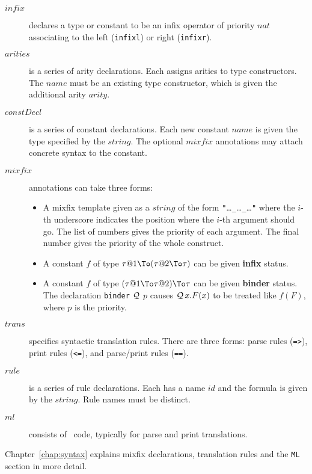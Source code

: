 \begin{description}
\item[$infix$] 
  declares a type or constant to be an infix operator of priority $nat$
  associating to the left ({\tt infixl}) or right ({\tt infixr}).

\item[$arities$] 
  is a series of arity declarations.  Each assigns arities to type
  constructors.  The $name$ must be an existing type constructor, which is
  given the additional arity $arity$.

\item[$constDecl$] 
  is a series of constant declarations.  Each new constant $name$ is given
  the type specified by the $string$.  The optional $mixfix$ annotations
  may attach concrete syntax to the constant.

\item[$mixfix$] 
  annotations can take three forms:
  \begin{itemize}
  \item A mixfix template given as a $string$ of the form
    {\tt"}\dots{\tt\_}\dots{\tt\_}\dots{\tt"} where the $i$-th underscore
    indicates the position where the $i$-th argument should go.  The list
    of numbers gives the priority of each argument.  The final number gives
    the priority of the whole construct.

  \item A constant $f$ of type $\tau@1\To(\tau@2\To\tau)$ can be given {\bf
    infix} status.

  \item A constant $f$ of type $(\tau@1\To\tau@2)\To\tau$ can be given {\bf
    binder} status.  The declaration {\tt binder} $\cal Q$ $p$ causes
  ${\cal Q}\,x.F(x)$ to be treated
  like $f(F)$, where $p$ is the priority.
  \end{itemize}

\item[$trans$] 
  specifies syntactic translation rules.  There are three forms: parse
  rules ({\tt =>}), print rules ({\tt <=}), and parse/print rules ({\tt ==}).

\item[$rule$]  
  is a series of rule declarations.  Each has a name $id$ and the
  formula is given by the $string$.  Rule names must be distinct.

\item[$ml$] 
  consists of \ML\ code, typically for parse and print translations.
\end{description}
%
Chapter~\ref{chap:syntax} explains mixfix declarations, translation rules
and the {\tt ML} section in more detail. 


